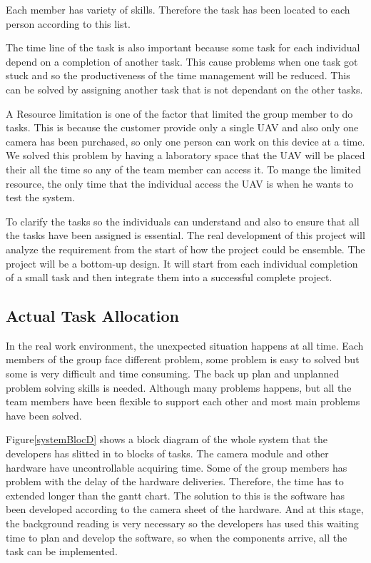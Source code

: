 \documentclass[oneside]{ecsgdp}         %
\begin{document}
Each member has variety of skills. Therefore the task has been located to each person according to this list.

The time line of the task is also important because some task for each individual depend on a completion of another task. This cause problems when one task got stuck and so the productiveness of the time management will be reduced. This can be solved by assigning another task that is not dependant on the other tasks. 

A Resource limitation is one of the factor that limited the group member to do tasks. This is because the customer provide only a single UAV and also only one camera has been purchased, so only one person can work on this device at a time. We solved this problem by having a laboratory space that the UAV will be placed their all the time so any of the team member can access it. To mange the limited resource, the only time that the individual access the UAV is when he wants to test the system. 

To clarify the tasks so the individuals can understand and also to ensure that all the tasks have been assigned is essential. The real development of this project will analyze the requirement from the start of how the project could be ensemble. The project will be a bottom-up design. It will start from each individual completion of a small task and then integrate them into a successful complete project. 



\subsection{Actual Task Allocation}

In the real work environment, the unexpected situation happens at all time. Each members of the group face different problem, some problem is easy to solved but some is very difficult and time consuming. The back up plan and unplanned problem solving skills is needed. Although many problems happens, but all the team members have been flexible to support each other and most main problems have been solved.

Figure\ref{systemBlocD} shows a block diagram of the whole system that the developers has slitted in to blocks of tasks. 
The camera module and other hardware have uncontrollable acquiring time. Some of the group members has problem with the delay of the hardware deliveries. Therefore, the time has to extended longer than the gantt chart. The solution to this is the software has been developed according to the camera sheet of the hardware. And at this stage, the background reading is very necessary so the developers has used this waiting time to plan and develop the software, so when the components arrive, all the task can be implemented.
\end{document}
